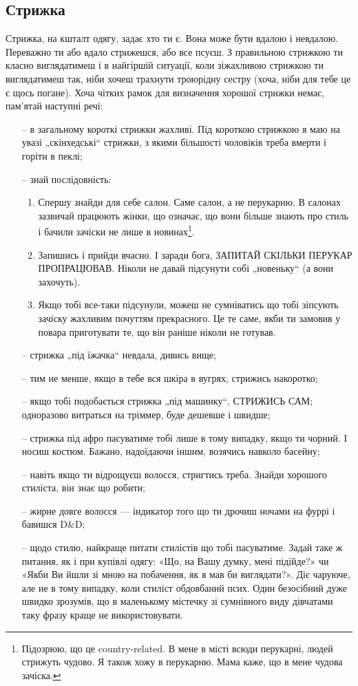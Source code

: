 \subsection{Стрижка}
Стрижка, на кшталт одягу, задає хто ти є. Вона може бути вдалою і невдалою.
Переважно ти або вдало стрижешся, або все псуєш. З правильною стрижкою ти
класно виглядатимеш і в найгіршій ситуації, коли зіжахливою стрижкою ти
виглядатимеш так, ніби хочеш трахнути троюрідну сестру (хоча, ніби для тебе
це є щось погане). Хоча чітких рамок для визначення хорошої стрижки немає,
пам’ятай наступні речі:

\begin{itemize}
	\item[--] в загальному короткі стрижки жахливі. Під короткою стрижкою
	я маю на увазі „скінхедські“ стрижки, з якими більшості чоловіків треба
	вмерти і горіти в пеклі;
	\item[--] знай послідовність:
	\begin{enumerate}
		\item Спершу знайди для себе салон. Саме салон, а не перукарню. В
		салонах зазвичай працюють жінки, що означає, що вони більше знають про
		стиль і бачили зачіски не лише в новинах\footnote{Підозрюю, що це
		country-related. В мене в місті всюди перукарні, людей стрижуть
		чудово. Я також хожу в перукарню. Мама каже, що в мене чудова
		зачіска.}.
		\item Запишись і прийди вчасно. І заради бога, ЗАПИТАЙ СКІЛЬКИ ПЕРУКАР
		ПРОПРАЦЮВАВ. Ніколи не давай підсунути собі „новеньку“ (а вони
		захочуть).
		\item Якщо тобі все-таки підсунули, можеш не сумніватись що тобі
		зіпсують зачіску жахливим почуттям прекрасного. Це те саме, якби ти
		замовив у повара приготувати те, що він раніше ніколи не готував.
	\end{enumerate}
	\item[--] стрижка „під їжачка“ невдала, дивись вище;
	\item[--] тим не менше, якщо в тебе вся шкіра в вугрях, стрижись накоротко;
	\item[--] якщо тобі подобається стрижка „під машинку“, СТРИЖИСЬ САМ;
	одноразово витраться на тріммер, буде дешевше і швидше;
	\item[--] стрижка під афро пасуватиме тобі лише в тому випадку, якщо ти
	чорний. І носиш костюм. Бажано, надоїдаючи іншим, возячись навколо
	басейну;
	\item[--] навіть якщо ти відрощуєш волосся, стригтись треба. Знайди
	хорошого стиліста, він знає що робити;
	\item[--] жирне довге волосся — індикатор того що ти дрочиш ночами на
	фуррі і бавишся D\&D;
	\item[--] щодо стилю, найкраще питати стилістів що тобі пасуватиме. Задай
	таке ж питання, як і при купівлі одягу: «Що, на Вашу думку, мені підійде?»
	чи «Якби Ви йшли зі мною на побачення, як я мав би виглядати?». Діє
	чаруюче, але не в тому випадку, коли стиліст обдовбаний псих. Один
	безосібний дуже швидко зрозумів, що в маленькому містечку зі сумнівного
	виду дівчатами таку фразу краще не використовувати.
\end{itemize}
